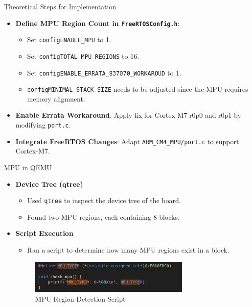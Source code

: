 \begin{frame}{Theoretical Steps for Implementation}
    \begin{itemize}
        \item \textbf{Define MPU Region Count in \texttt{FreeRTOSConfig.h}}:
            \begin{itemize}
                \item Set \texttt{configENABLE\_MPU} to 1.
                \item Set \texttt{configTOTAL\_MPU\_REGIONS} to 16.
                \item Set \texttt{configENABLE\_ERRATA\_837070\_WORKAROUD} to 1.
                \item \texttt{configMINIMAL\_STACK\_SIZE} needs to be adjusted since the MPU requires memory alignment.
            \end{itemize}
        \item \textbf{Enable Errata Workaround}: Apply fix for Cortex-M7 r0p0 and r0p1 by modifying \texttt{port.c}.
        \item \textbf{Integrate FreeRTOS Changes}: Adapt \texttt{ARM\_CM4\_MPU/port.c} to support Cortex-M7.
    \end{itemize}
\end{frame}

\begin{frame}{MPU in QEMU}
    \begin{itemize}
        \item \textbf{Device Tree (qtree)}
        \begin{itemize}
            \item Used \texttt{qtree} to inspect the device tree of the board.
            \item Found two MPU regions, each containing 8 blocks.
        \end{itemize}
        \item \textbf{Script Execution}
        \begin{itemize}
            \item Ran a script to determine how many MPU regions exist in a block.
        \end{itemize}
        \begin{figure}[h]
            \centering
            \includegraphics[width=0.75\textwidth]{images/mpu_qemu_1.png}
            \caption{MPU Region Detection Script}
        \end{figure}
    \end{itemize}
\end{frame}

